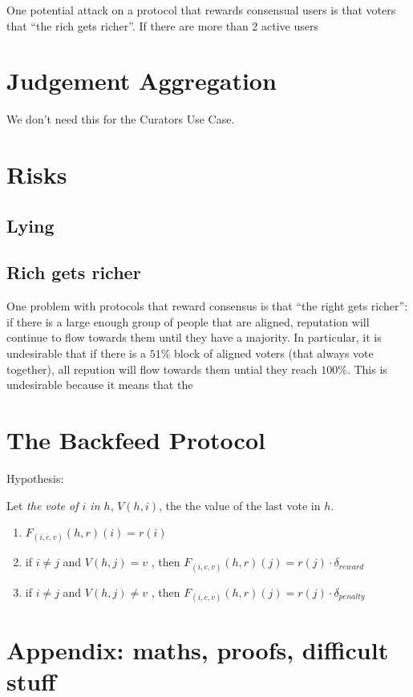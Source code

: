 \documentclass{article}
\begin{document}
One potential attack on a protocol that rewards consensual users is that voters that ``the rich gets richer''. 
If there are more than 2 active users
\section{Judgement Aggregation}

We don't need this for the Curators Use Case.

\section{Risks}

\subsection{Lying}

\subsection{Rich gets richer}

One problem with protocols that reward consensus is that ``the right gets richer'': if there is a large enough group of people that are aligned, reputation will continue to flow towards them until they have a majority. In particular, it is undesirable that if there is a $51\%$ block of aligned voters (that always vote together), all repution will flow towards them untial they reach $100\%$. This is undesirable because it means that the  

\section{The Backfeed Protocol}


Hypothesis:

Let {\em the vote of $i$ in $h$}, $V(h, i)$, the the value of the last vote in $h$.
\begin{enumerate}
\item $F_(i,c,v)(h,r)(i) = r(i)$
\item if $i \neq j$  and $V(h, j) = v$ , then $F_(i,c,v)(h,r)(j)= r(j) \cdot \delta_{reward}$
\item if $i \neq j$  and $V(h, j) \neq v$ , then $F_(i,c,v)(h,r)(j)= r(j) \cdot \delta_{penalty}$
\end{enumerate}
\section{Appendix: maths, proofs, difficult stuff}
\end{document}
